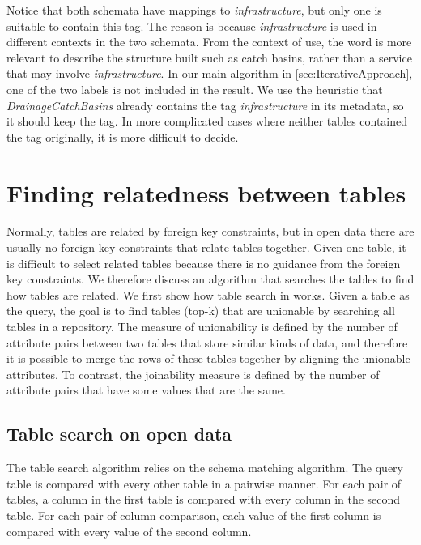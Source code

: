 Notice that both schemata have mappings to \textit{infrastructure}, but only one is suitable to contain this tag. The reason is because \textit{infrastructure} is used in different contexts in the two schemata. From the context of use, the word is more relevant to describe the structure built such as catch basins, rather than a service that may involve \textit{infrastructure}. In our main algorithm in \autoref{sec:IterativeApproach}, one of the two labels is not included in the result. We use the heuristic that \textit{DrainageCatchBasins} already contains the tag \textit{infrastructure} in its metadata, so it should keep the tag. In more complicated cases where neither tables contained the tag originally, it is more difficult to decide.

\section{Finding relatedness between tables}
\label{sec:FindingRelatednessBetweenTables}

Normally, tables are related by foreign key constraints, but in open data there are usually no foreign key constraints that relate tables together. Given one table, it is difficult to select related tables because there is no guidance from the foreign key constraints. We therefore discuss an algorithm that searches the tables to find how tables are related. We first show how table search in \cite{Nargesian2018Table} works. Given a table as the query, the goal is to find tables (top-k) that are unionable by searching all tables in a repository. The measure of unionability is defined by the number of attribute pairs between two tables that store similar kinds of data, and therefore it is possible to merge the rows of these tables together by aligning the unionable attributes. To contrast, the joinability measure is defined by the number of attribute pairs that have some values that are the same.

\subsection{Table search on open data}
\label{ssec:TableSearchOnOpenData}

The table search algorithm relies on the schema matching algorithm. The query table is compared with every other table in a pairwise manner. For each pair of tables, a column in the first table is compared with every column in the second table. For each pair of column comparison, each value of the first column is compared with every value of the second column.

